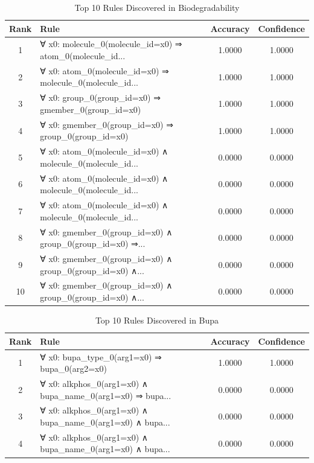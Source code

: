 \documentclass[11pt,a4paper]{article}
\begin{document}
\begin{table}[h!]
\centering
\small
\caption{Top 10 Rules Discovered in Biodegradability}
\label{tab:rules_Biodegradability}
\begin{tabular}{|c|p{5cm}|c|c|}
\hline
\textbf{Rank} & \textbf{Rule} & \textbf{Accuracy} & \textbf{Confidence} \\
\hline
1 & ∀ x0: molecule\_0(molecule\_id=x0) ⇒ atom\_0(molecule\_id... & 1.0000 & 1.0000 \\
2 & ∀ x0: atom\_0(molecule\_id=x0) ⇒ molecule\_0(molecule\_id... & 1.0000 & 1.0000 \\
3 & ∀ x0: group\_0(group\_id=x0) ⇒ gmember\_0(group\_id=x0) & 1.0000 & 1.0000 \\
4 & ∀ x0: gmember\_0(group\_id=x0) ⇒ group\_0(group\_id=x0) & 1.0000 & 1.0000 \\
5 & ∀ x0: atom\_0(molecule\_id=x0) ∧ molecule\_0(molecule\_id... & 0.0000 & 0.0000 \\
6 & ∀ x0: atom\_0(molecule\_id=x0) ∧ molecule\_0(molecule\_id... & 0.0000 & 0.0000 \\
7 & ∀ x0: atom\_0(molecule\_id=x0) ∧ molecule\_0(molecule\_id... & 0.0000 & 0.0000 \\
8 & ∀ x0: gmember\_0(group\_id=x0) ∧ group\_0(group\_id=x0) ⇒... & 0.0000 & 0.0000 \\
9 & ∀ x0: gmember\_0(group\_id=x0) ∧ group\_0(group\_id=x0) ∧... & 0.0000 & 0.0000 \\
10 & ∀ x0: gmember\_0(group\_id=x0) ∧ group\_0(group\_id=x0) ∧... & 0.0000 & 0.0000 \\
\hline
\end{tabular}
\end{table}

\begin{table}[h!]
\centering
\small
\caption{Top 10 Rules Discovered in Bupa}
\label{tab:rules_Bupa}
\begin{tabular}{|c|p{5cm}|c|c|}
\hline
\textbf{Rank} & \textbf{Rule} & \textbf{Accuracy} & \textbf{Confidence} \\
\hline
1 & ∀ x0: bupa\_type\_0(arg1=x0) ⇒ bupa\_0(arg2=x0) & 1.0000 & 1.0000 \\
2 & ∀ x0: alkphos\_0(arg1=x0) ∧ bupa\_name\_0(arg1=x0) ⇒ bupa... & 0.0000 & 0.0000 \\
3 & ∀ x0: alkphos\_0(arg1=x0) ∧ bupa\_name\_0(arg1=x0) ∧ bupa... & 0.0000 & 0.0000 \\
4 & ∀ x0: alkphos\_0(arg1=x0) ∧ bupa\_name\_0(arg1=x0) ∧ bupa... & 0.0000 & 0.0000 \\
\hline
\end{tabular}
\end{table}
\end{document}
